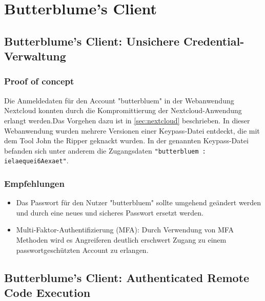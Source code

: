 \chapter{Butterblume's Client}


\section{\makecvssbadge Butterblume's Client: Unsichere Credential-Verwaltung}

\subsection*{Proof of concept} 
Die Anmeldedaten für den Account "butterbluem" in der Webanwendung Nextcloud konnten durch die Kompromittierung der Nextcloud-Anwendung erlangt werden.Das Vorgehen dazu ist in \autoref{sec:nextcloud} beschrieben. In dieser Webanwendung wurden mehrere Versionen einer Keypass-Datei entdeckt, die mit dem Tool John the Ripper geknackt wurden. In der genannten Keypass-Datei befanden sich unter anderem die Zugangsdaten \texttt{"butterbluem : ielaequei6Aexaet"}.

\subsection*{Empfehlungen}
\begin{itemize}
    \item Das Passwort für den Nutzer "butterbluem" sollte umgehend geändert werden und durch eine neues und sicheres Passwort ersetzt werden.
    \item Multi-Faktor-Authentifizierung (MFA): Durch Verwendung von MFA Methoden wird es Angreiferen deutlich erschwert Zugang zu einem passwortgeschützten Account zu erlangen.
\end{itemize}


\section{\makecvssbadge Butterblume's Client: Authenticated Remote Code Execution}

